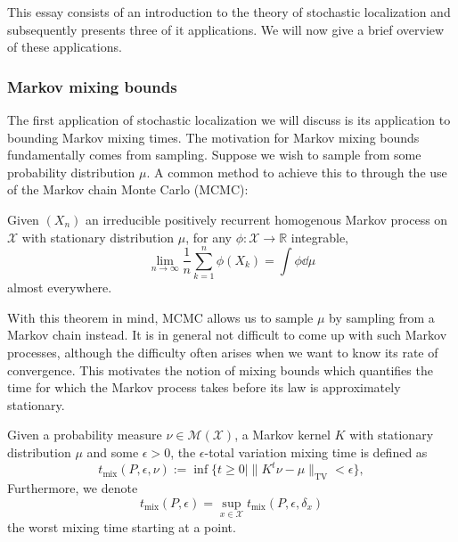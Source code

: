 This essay consists of an introduction to the theory of stochastic localization and subsequently presents three 
of it applications. We will now give a brief overview of these applications.

\subsubsection{Markov mixing bounds}


The first application of stochastic localization we will discuss is its application to bounding Markov
mixing times. The motivation for Markov mixing bounds fundamentally comes from sampling. Suppose we wish to sample 
from some probability distribution $\mu$. A common method to achieve this to through the use of the 
Markov chain Monte Carlo (MCMC):
\begin{theorem}[MCMC]\label{thm:markov_conv}
  Given \((X_n)\) an irreducible positively recurrent homogenous Markov process on \(\mathcal{X}\) with
  stationary distribution \(\mu\), for any \(\phi : \mathcal{X} \to \mathbb{R}\) integrable, 
  \[\lim_{n \to \infty} \frac{1}{n} \sum_{k = 1}^n \phi(X_k) = \int \phi \dd \mu\]
  almost everywhere.  
\end{theorem}
With this theorem in mind, MCMC allows us to sample \(\mu\) by sampling from a Markov chain instead. It is in general 
not difficult to come up with such Markov processes, although the difficulty often arises when we want to know its rate of convergence. 
This motivates the notion of mixing bounds which quantifies the time for which the Markov process takes before 
its law is approximately stationary.

\begin{definition}
  Given a probability measure \(\nu \in \mathcal{M}(\mathcal{X})\), a Markov kernel \(K\) with stationary 
  distribution \(\mu\) and some \(\epsilon > 0\), the \(\epsilon\)-total variation mixing time is defined as 
  \[t_{\text{mix}}(P, \epsilon, \nu) := \inf \{t \ge 0 \mid \|K^t\nu - \mu\|_{\text{TV}} < \epsilon\},\]
  Furthermore, we denote 
  \[t_{\text{mix}}(P, \epsilon) = \sup_{x \in \mathcal{X}} t_{\text{mix}}(P, \epsilon, \delta_x)\]
  the worst mixing time starting at a point.
\end{definition}


